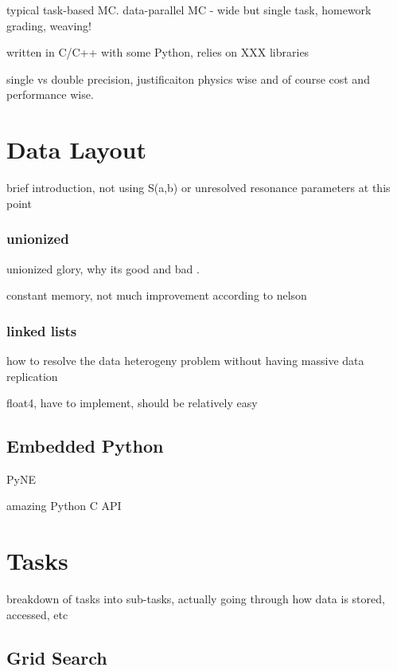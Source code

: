 typical task-based MC.  data-parallel MC - wide but single task, homework grading, weaving!

written in C/C++ with some Python, relies on XXX libraries

single vs double precision, justificaiton physics wise and of course cost and performance wise.


\section{Data Layout}

brief introduction, not using S(a,b) or unresolved resonance parameters at this point

\subsubsection{unionized}

unionized glory, why its good and bad \cite{jaakko}.

constant memory, not much improvement according to nelson

\subsubsection{linked lists}

how to resolve the data heterogeny problem without having massive data replication

float4, have to implement, should be relatively easy

\subsection{Embedded Python}

PyNE

amazing Python C API



\section{Tasks}

breakdown of tasks into sub-tasks, actually going through how data is stored, accessed, etc

\subsection{Grid Search}

